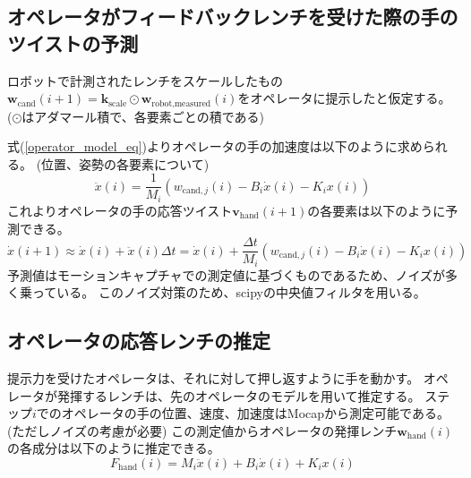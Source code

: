 \documentclass[uplatex]{jsarticle}
\begin{document}
\subsection{オペレータがフィードバックレンチを受けた際の手のツイストの予測}
ロボットで計測されたレンチをスケールしたもの$\bm{w}_{\text{cand}}(i+1) = \bm{k}_{\text{scale}} \odot \bm{w}_{\text{robot,measured}}(i)$をオペレータに提示したと仮定する。
($\odot$はアダマール積で、各要素ごとの積である)

式(\ref{operator_model_eq})よりオペレータの手の加速度は以下のように求められる。
(位置、姿勢の各要素について)
\begin{equation}
  \ddot{x}(i) = \frac{1}{M_i} (w_{\text{cand},j}(i) - B_i \dot{x}(i) - K_i x(i))
\end{equation}
これよりオペレータの手の応答ツイスト$\bm{v}_{\text{hand}}(i+1)$の各要素は以下のように予測できる。
\begin{equation}
  \dot{x}(i+1) \approx \dot{x}(i) + \ddot{x}(i) \Delta t = \dot{x}(i) + \frac{\Delta t}{M_i} (w_{\text{cand},j}(i) - B_i \dot{x}(i) - K_i x(i))
\end{equation}
予測値はモーションキャプチャでの測定値に基づくものであるため、ノイズが多く乗っている。
このノイズ対策のため、scipyの中央値フィルタを用いる。
  

\subsection{オペレータの応答レンチの推定}
提示力を受けたオペレータは、それに対して押し返すように手を動かす。
オペレータが発揮するレンチは、先のオペレータのモデルを用いて推定する。
ステップ$i$でのオペレータの手の位置、速度、加速度はMocapから測定可能である。
(ただしノイズの考慮が必要)
この測定値からオペレータの発揮レンチ$\bm{w}_{\text{hand}}(i)$の各成分は以下のように推定できる。
\begin{equation}
  F_{\text{hand}}(i) = M_i \ddot{x}(i) + B_i \dot{x}(i) + K_i x(i)
\end{equation}
\end{document}
